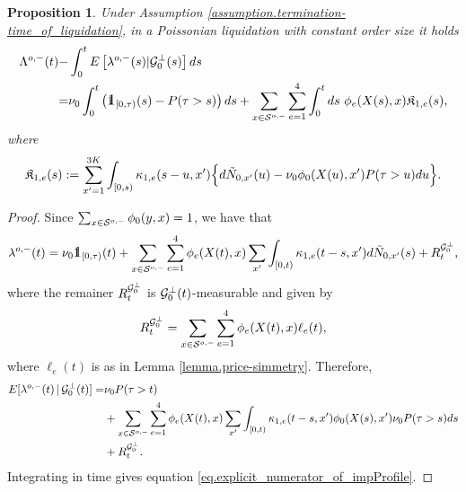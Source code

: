 \documentclass[10pt]{article}
\newtheorem{prop}[thm]{Proposition}
\begin{document}
\begin{prop}\label{prop.impact_poisson_and_constant-size}
 Under Assumption \ref{assumption.termination-time_of_liquidation}, in a Poissonian liquidation with constant order size 
 it holds
 \begin{equation}\label{eq.explicit_numerator_of_impProfile}
 \begin{split}
  \weakDeflCompensator(t) 
    -& \intzerot\Expectation\left[\weakDeflIntensity(s)\vert \liquidatorSigmaAlgebra\orthogonal(s)\right]ds
\\
=&
\baseRate_{0}\intzerot \left(\one_{[0,\terminationTime)} (s) - \Prob(\terminationTime>s)\right)ds
+
\sum_{x\in\weakDeflSpace} \sum_{e=1}^{4}
\intzerot ds \, \, \transProb_{e}(\stateVariable(s),x)\Kappa_{1,e}(s),
\end{split}
 \end{equation}
 where 
 \begin{equation*}
  \mathfrak{K}_{1,e}(s) :=
\sum_{x^{\prime}=1}^{3K}\int_{[0,s)}\kappa_{1,e}(s-u, x^{\prime})
\Big\lbrace
d\tilde{N}_{0,x^{\prime}}(u)
- \nu_{0}\phi_{0}(X(u),x^{\prime}){{P}}(\tau>u) du
\Big\rbrace.
 \end{equation*}
\end{prop}
\begin{proof}
 Since $\sum_{x\in\mathcal{S}^{o,-}}\phi_{0}(y,x) = 1$, we have that 
 \begin{equation*}
  \weakDeflIntensity(t)
  =
  \baseRate_{0} \one_{[0,\terminationTime)} (t)
  + \sum_{x\in\weakDeflSpace} \sum_{e=1}^{4}
  \transProb_e(\stateVariable(t),x)\sum_{\xone} \int_{[0,t)} \hawkesKernel_{1,e}(t-s, \xone) d\hybridHawkes_{0,\xone}(s)
  + R_{t}^{\sigmaAlgebraG_{0}\orthogonal},
 \end{equation*}
where the remainer $R_{t}^{\mathcal{G}_{0}^{\perp}}$ is $\mathcal{G}_{0}^{\perp}(t)$-measurable and given by
\begin{equation*}
 R_{t}^{\mathcal{G}_{0}^{\perp}}
 =
 \sum_{x\in\mathcal{S}^{o,-}}\sum_{e=1}^{4}
 \phi_{e}(X(t),x) \ell_{e}(t),
\end{equation*}
where $\ell_e(t)$ is as in Lemma \ref{lemma.price-simmetry}. Therefore, 
\begin{equation*}
 \begin{split}
  {{E}}[\lambda_{}^{o,-}(t)\,\vert\, \mathcal{G}_{0}^{\perp}(t) ]
  =& 
  \nu_{0} {{P}}(\tau > t)
  \\
  &+
  \sum_{x\in\mathcal{S}^{o,-}} \sum_{e=1}^{4}
  \phi_e(X(t),x)\sum_{x^{\prime}} \int_{[0,t)} \kappa_{1,e}(t-s, x^{\prime}) \phi_{0}(X(s),x^{\prime}) \nu_{0}{{P}}(\tau>s) ds
  \\
  &+ R^{\mathcal{G}_{0}^{\perp}}_{t}.
 \end{split}
\end{equation*}
Integrating in time gives equation \eqref{eq.explicit_numerator_of_impProfile}.
\end{proof}
\end{document}
